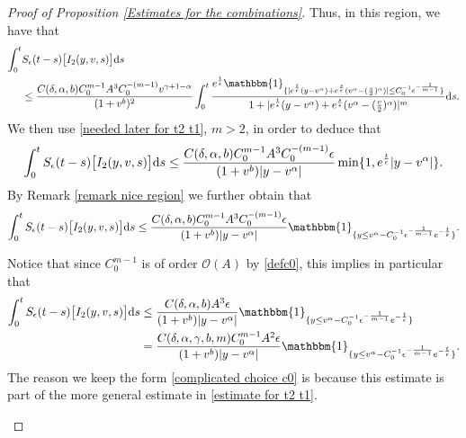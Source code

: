 \documentclass[11pt]{article}
\numberwithin{equation}{section}
\newcommand{\der}{\textup{d}}
\begin{document}
\begin{proof}[Proof of Proposition \ref{Estimates for the combinations}]
Thus, in this region, we have that 
\begin{align*}
\int_{0}^{t} & S_{\epsilon}(t-s)\big[ I_{2}(y,v,s)\big]\der s\\
&\leq \frac{C(\delta,\alpha,b)C_{0}^{m-1}A^{3}  C_{0}^{-(m-1)}v^{\gamma+1-\alpha} }{(1+v^{b})^{2}}\int_{0}^{t}\frac{e^{\frac{t}{\epsilon}}\mathbbm{1}_{\{|e^{\frac{t}{\epsilon}}(y-v^{\alpha})+e^{\frac{s}{\epsilon}}(v^{\alpha}-(\frac{v}{2})^{\alpha})|\leq C_{0}^{-1}\epsilon^{-\frac{1}{m-1}} \}}}{1+|e^{\frac{t}{\epsilon}}(y-v^{\alpha})+e^{\frac{s}{\epsilon}}(v^{\alpha}-(\frac{v}{2})^{\alpha})|^{m}} \der s.
      \end{align*}
We then use \eqref{needed later for t2 t1}, $m>2$, in order to deduce that
\begin{align*}
   \int_{0}^{t}S_{\epsilon}(t-s)\big[ I_{2}(y,v,s)\big]\der s\leq   \frac{ C(\delta,\alpha,b)C_{0}^{m-1}A^{3}  C_{0}^{-(m-1)} \epsilon}{(1+v^{b})|y-v^{\alpha}|}\min\{1,e^{\frac{t}{\epsilon}}|y-v^{\alpha}|\}.
\end{align*}
 By Remark \ref{remark nice region} we further obtain that 
 \begin{align}\label{complicated choice c0}
   \int_{0}^{t}S_{\epsilon}(t-s)\big[ I_{2}(y,v,s)\big]\der s\leq   \frac{ C(\delta,\alpha,b)C_{0}^{m-1}A^{3}  C_{0}^{-(m-1)} \epsilon}{(1+v^{b})|y-v^{\alpha}|}\mathbbm{1}_{\{y\leq v^{\alpha}-C_{0}^{-1}\epsilon^{-\frac{1}{m-1}}e^{-\frac{t}{\epsilon}}\}}.
\end{align}
\begin{rmk}
Notice that since $C_{0}^{m-1}$ is of order $\mathcal{O}(A)$ by \eqref{defc0}, this implies in particular that
\begin{align*}
 \int_{0}^{t}S_{\epsilon}(t-s)\big[ I_{2}(y,v,s)\big]\der s &\leq   \frac{ C(\delta,\alpha,b)A^{3}  \epsilon}{(1+v^{b})|y-v^{\alpha}|}\mathbbm{1}_{\{y\leq v^{\alpha}-C_{0}^{-1}\epsilon^{-\frac{1}{m-1}}e^{-\frac{t}{\epsilon}}\}}\\
 &=  \frac{ C(\delta,\alpha,\gamma,b,m)C_{0}^{m-1}A^{2}  \epsilon}{(1+v^{b})|y-v^{\alpha}|}\mathbbm{1}_{\{y\leq v^{\alpha}-C_{0}^{-1}\epsilon^{-\frac{1}{m-1}}e^{-\frac{t}{\epsilon}}\}}.
\end{align*}
The reason we keep the form \eqref{complicated choice c0} is because this estimate is part of the more general estimate in \eqref{estimate for t2 t1}.
\end{rmk}



\end{proof}
\end{document}

